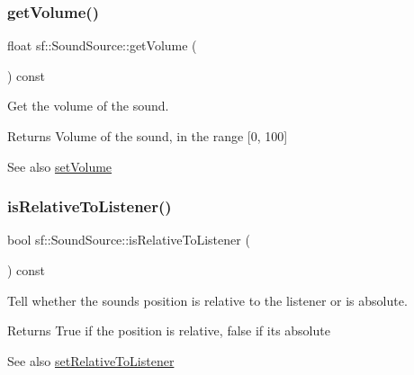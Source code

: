 \mbox{\label{classsf_1_1_sound_source_a04243fb5edf64561689b1d58953fc4ce}} 
\subsubsection{\texorpdfstring{getVolume()}{getVolume()}}
{\footnotesize\ttfamily float sf\+::\+Sound\+Source\+::get\+Volume (\begin{DoxyParamCaption}{ }\end{DoxyParamCaption}) const}



Get the volume of the sound. 

\begin{DoxyReturn}{Returns}
Volume of the sound, in the range \mbox{[}0, 100\mbox{]}
\end{DoxyReturn}
\begin{DoxySeeAlso}{See also}
\mbox{\hyperlink{classsf_1_1_sound_source_a2f192f2b49fb8e2b82f3498d3663fcc2}{set\+Volume}} \begin{DoxyVerb}\end{DoxyVerb}
 
\end{DoxySeeAlso}
\mbox{\label{classsf_1_1_sound_source_adcdb4ef32c2f4481d34aff0b5c31534b}} 
\subsubsection{\texorpdfstring{isRelativeToListener()}{isRelativeToListener()}}
{\footnotesize\ttfamily bool sf\+::\+Sound\+Source\+::is\+Relative\+To\+Listener (\begin{DoxyParamCaption}{ }\end{DoxyParamCaption}) const}



Tell whether the sound\textquotesingle{}s position is relative to the listener or is absolute. 

\begin{DoxyReturn}{Returns}
True if the position is relative, false if it\textquotesingle{}s absolute
\end{DoxyReturn}
\begin{DoxySeeAlso}{See also}
\mbox{\hyperlink{classsf_1_1_sound_source_ac478a8b813faf7dd575635b102081d0d}{set\+Relative\+To\+Listener}} \begin{DoxyVerb}\end{DoxyVerb}
 
\end{DoxySeeAlso}
\mbox{\label{classsf_1_1_sound_source_a355a07f34b5ecc38465d39a33b701b6d}} 

